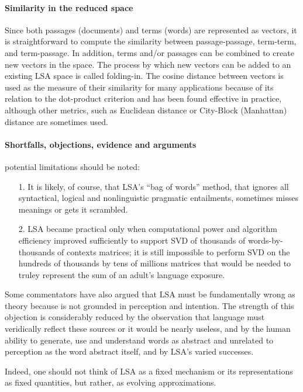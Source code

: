 \paragraph{Similarity in the reduced space}
Since both passages (documents) and terms (words) are represented as vectors, it is straightforward to compute the similarity between passage-passage, term-term, and term-passage. In addition, terms and/or passages can be combined to create new vectors in the space. The process by which new vectors can be added to an existing LSA space is called folding-in. The cosine distance between vectors is used as the measure of their similarity for many applications because of its relation to the dot-product criterion and has been found effective in practice, although other metrics, such as Euclidean distance or City-Block (Manhattan) distance are sometimes used.

\paragraph{Shortfalls, objections, evidence and arguments}
potential limitations should be noted:
\begin{itemize}
\item [1.] It is likely, of course, that LSA's “bag of words” method, that ignores all syntactical, logical and nonlinguistic pragmatic entailments, sometimes misses meanings or gets it scrambled.
\item[2.] LSA became practical only when computational power and algorithm efficiency improved sufficiently to support SVD of thousands of words-by-thousands of contexts matrices; it is still impossible to perform SVD on the hundreds of thousands by tens of millions matrices that would be needed to truley represent the sum of an adult's language exposure.
\end{itemize}
Some commentators have also argued that LSA must be fundamentally wrong as theory because is not grounded in perception and intention. The strength of this objection is considerably reduced by the observation that language must veridically reflect these sources or it would be nearly useless, and by the human ability to generate, use and understand words as abstract and unrelated to perception as the word abstract itself, and by LSA’s varied successes.

Indeed, one should not think of LSA as a fixed mechanism or its representations as
fixed quantities, but rather, as evolving approximations.

